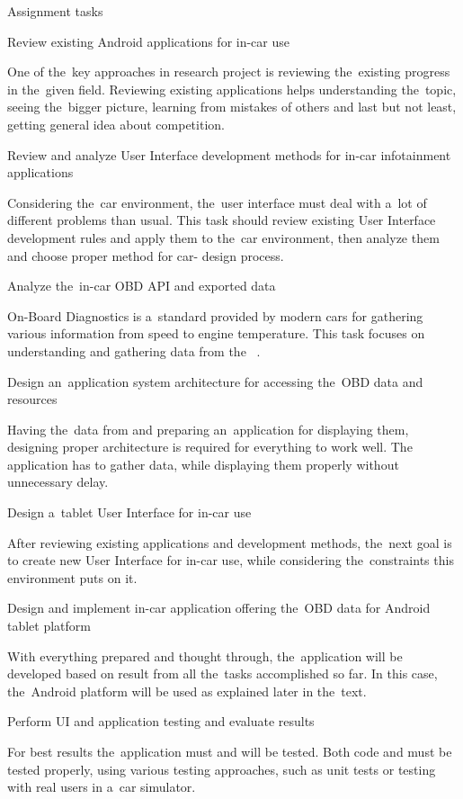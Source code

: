 \secc Assignment tasks

\seccc Review existing Android applications for in-car use

One of the~key approaches in research project is reviewing the~existing progress in the~given field. Reviewing existing applications helps understanding the~topic, seeing the~bigger picture, learning from mistakes of others and last but not least, getting general idea about competition.

\seccc Review and analyze User Interface development methods for in-car infotainment applications

Considering the~car environment, the~user interface must deal with a~lot of different problems than usual. This task should review existing User Interface development rules and apply them to the~car environment, then analyze them and choose proper method for car- design process.

\seccc Analyze the~in-car OBD API and exported data

On-Board Diagnostics  is a~standard  provided by modern cars for gathering various information from speed to engine temperature. This task focuses on understanding and gathering data from the~ .

\seccc Design an~application system architecture for accessing the~OBD data and resources

Having the~data from  and preparing an~application for displaying them, designing proper architecture is required for everything to work well. The application has to gather data, while displaying them properly without unnecessary delay.

\seccc Design a~tablet User Interface for in-car use

After reviewing existing applications and  development methods, the~next goal is to create new User Interface for in-car use, while considering the~constraints this environment puts on it.

\seccc Design and implement in-car application offering the~OBD data for Android tablet platform

With everything prepared and thought through, the~application will be developed based on result from all the~tasks accomplished so far. In this case, the~Android platform will be used as explained later in the~text.

\seccc Perform UI and application testing and evaluate results

For best results the~application must and will be tested. Both code and  must be tested properly, using various testing approaches, such as unit tests or  testing with real users in a~car simulator.

